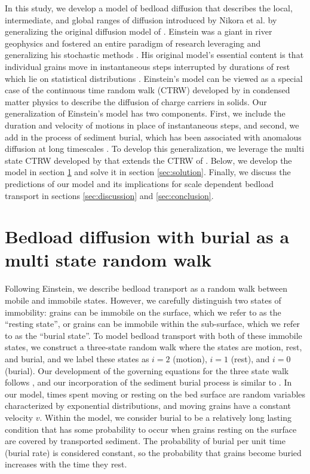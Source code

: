 \documentclass[draft,grl]{agujournal2018}
\begin{document}
In this study, we develop a model of bedload diffusion that describes the local, intermediate, and global ranges of diffusion introduced by Nikora et al. by generalizing the original diffusion model of \citet{Einstein1937}.
Einstein was a giant in river geophysics and fostered an entire paradigm of research leveraging and generalizing his stochastic methods \citep[e.g.,][]{Hubbell1964, Yano1969, Yang1971, Gordon1972, Nakagawa1976}.
His original model's essential content is that individual grains move in instantaneous steps interrupted by durations of rest which lie on statistical distributions \citep{Hassan1991}.
Einstein's model can be viewed as a special case of the continuous time random walk (CTRW) developed by \citet{Montroll1965} in condensed matter physics to describe the diffusion of charge carriers in solids.
Our generalization of Einstein's model has two components.
First, we include the duration and velocity of motions in place of instantaneous steps, and second, we add in the process of sediment burial, which has been associated with anomalous diffusion at long timescales \citep[e.g.,][]{Bradley2017,Martin2014}.
To develop this generalization, we leverage the multi state CTRW developed by \citet{Weiss1976, Weiss1994} that extends the CTRW of \citet{Montroll1965}.
Below, we develop the model in section \ref{sec:model} and solve it in section \ref{sec:solution}. Finally, we discuss the predictions of our model and its implications for scale dependent bedload transport in sections \ref{sec:discussion} and \ref{sec:conclusion}.

\section{Bedload diffusion with burial as a multi state random walk}
\label{sec:model}

Following Einstein, we describe bedload transport as a random walk between mobile and immobile states.
However, we carefully distinguish two states of immobility: grains can be immobile on the surface, which we refer to as the ``resting state'', or grains can be immobile within the sub-surface, which we refer to as the ``burial state''.
To model bedload transport with both of these immobile states, we construct a three-state random walk where the states are motion, rest, and burial, and we label these states as $i=2$ (motion), $i=1$ (rest), and $i=0$ (burial).
Our development of the governing equations for the three state walk follows \citet{Weiss1994}, and our incorporation of the sediment burial process is similar to \citet{Schmidt2007}.
In our model, times spent moving or resting on the bed surface are random variables characterized by exponential distributions, and moving grains have a constant velocity $v$.
Within the model, we consider burial to be a relatively long lasting condition that has some probability to occur when grains resting on the surface are covered by transported sediment.
The probability of burial per unit time (burial rate) is considered constant, so the probability that grains become buried increases with the time they rest.
\end{document}
